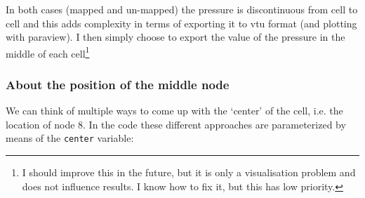 In both cases (mapped and un-mapped) the pressure is discontinuous from cell to cell 
and this adds complexity in terms of exporting it to vtu format (and plotting with paraview). 
I then simply choose to export the value of the pressure in the middle of 
each cell\footnote{I should improve this in the future, but it is 
only a visualisation problem and does not influence results.
I know how to fix it, but this has low priority.}

\subsubsection{About the position of the middle node}

We can think of multiple ways to come up with the `center' of the cell, 
i.e. the location of node 8. 
In the code these different approaches are parameterized by means of the
\lstinline{center} variable:

